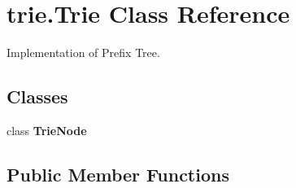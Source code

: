 \hypertarget{classtrie_1_1_trie}{}\section{trie.\+Trie Class Reference}
\label{classtrie_1_1_trie}


Implementation of Prefix Tree.  


\subsection*{Classes}
\begin{DoxyCompactItemize}
\item 
class {\bfseries Trie\+Node}
\end{DoxyCompactItemize}
\subsection*{Public Member Functions}
